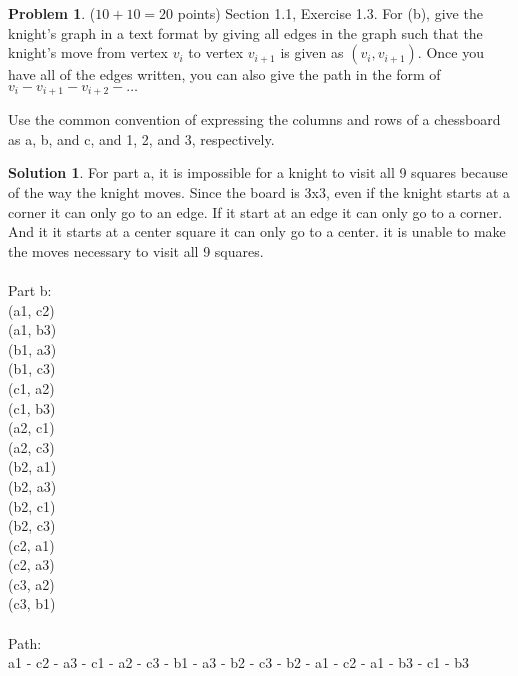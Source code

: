 \documentclass{article}
\theoremstyle{definition}
\newtheorem{problem}{Problem}
\newtheorem*{solution}{Solution}
\begin{document}
\newpage
\begin{problem} ($10+10=20$ points) Section 1.1, Exercise 1.3.
For (b), give the knight's graph in a text format by giving all
edges in the graph such that the knight's move from vertex $v_i$ to 
vertex $v_{i+1}$ is given as $(v_i, v_{i+1})$.  Once you have all of the
edges written, you can also give the path in the form of 
$v_i - v_{i+1} - v_{i+2} - \ldots$

Use the common convention of expressing the columns and rows of
a chessboard as a, b, and c, and 1, 2, and 3, respectively.
\end{problem}
\begin{solution}
  For part a, it is impossible for a knight to visit all 9 squares because of the way the knight moves. 
  Since the board is 3x3, even if the knight starts at a corner it can only go to an edge. 
  If it start at an edge it can only go to a corner. 
  And it it starts at a center square it can only go to a center.
  it is unable to make the moves necessary to visit all 9 squares.
  \\
  \\
  Part b:
  \\(a1, c2)
  \\(a1, b3)
  \\(b1, a3)
  \\(b1, c3)
  \\(c1, a2)
  \\(c1, b3)
  \\(a2, c1)
  \\(a2, c3)
  \\(b2, a1)
  \\(b2, a3)
  \\(b2, c1)
  \\(b2, c3)
  \\(c2, a1)
  \\(c2, a3)
  \\(c3, a2)
  \\(c3, b1)
  \\
  \\
  Path:
  \\a1 - c2 - a3 - c1 - a2 - c3 - b1 - a3 - b2 - c3 - b2 - a1 - c2 - a1 - b3 - c1 - b3
\end{solution}
\end{document}
